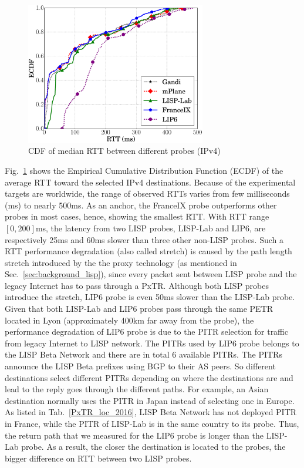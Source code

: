\begin{figure}[!t]
	\centering
	\includegraphics[width=0.7\textwidth]{Pics/v4/CDF_avg(RTT)_median_4_20.eps}
	\caption{CDF of median RTT between different probes (IPv4)}
	\label{CDF_of_median_RTT_between_different_probes_v4_2016}
\end{figure}

Fig.~\ref{CDF_of_median_RTT_between_different_probes_v4_2016} shows the Empirical Cumulative Distribution Function (ECDF) of the average RTT toward the selected IPv4 destinations. Because of the experimental targets are worldwide, the range of observed RTTs varies from few milliseconds (ms) to nearly 500ms. As an anchor, the FranceIX probe outperforms other probes in most cases, hence, showing the smallest RTT. With RTT range $[0, 200]$ms, the latency from two LISP probes, LISP-Lab and LIP6, are respectively 25ms and 60ms slower than three other non-LISP probes. Such a RTT performance degradation (also called stretch) is caused by the path length stretch introduced by the the proxy technology (as mentioned in Sec.~\ref{sec:background_lisp}), since every packet sent between LISP probe and the legacy Internet has to pass through a PxTR. Although both LISP probes introduce the stretch, LIP6 probe is even 50ms slower than the LISP-Lab probe. Given that both LISP-Lab and LIP6 probes pass through the same PETR located in Lyon (approximately 400km far away from the probe), the performance degradation of LIP6 probe is due to the PITR selection for traffic from legacy Internet to LISP network. The PITRs used by LIP6 probe belongs to the LISP Beta Network and there are in total 6 available PITRs. The PITRs announce the LISP Beta prefixes using BGP to their AS peers. So different destinations select different PITRs depending on where the destinations are and lead to the reply goes through the different paths. For example, an Asian destination normally uses the PITR in Japan instead of selecting one in Europe. As listed in Tab.~\ref{PxTR_loc_2016}, LISP Beta Network has not deployed PITR in France, while the PITR of LISP-Lab is in the same country to its probe. Thus, the return path that we measured for the LIP6 probe is longer than the LISP-Lab probe. As a result, the closer the destination is located to the probes, the bigger difference on RTT between two LISP probes.

